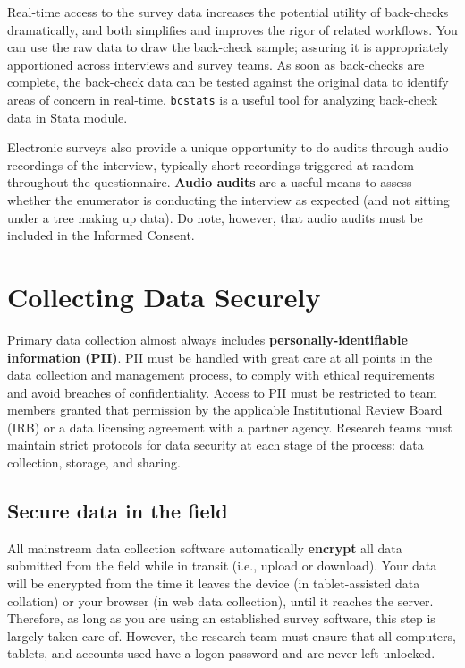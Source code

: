 Real-time access to the survey data increases the potential utility of
back-checks dramatically, and both simplifies and improves the rigor of related
workflows.
You can use the raw data to draw the back-check sample; assuring it is
appropriately apportioned across interviews and survey teams.
As soon as back-checks are complete, the back-check data can be tested against
the original data to identify areas of concern in real-time.
\texttt{bcstats} is a useful tool for analyzing back-check data in Stata module.

Electronic surveys also provide a unique opportunity to do audits through audio recordings of the interview,
typically short recordings triggered at random throughout the questionnaire.
\textbf{Audio audits} are a useful means to assess whether the enumerator is conducting the interview
as expected (and not sitting under a tree making up data).
Do note, however, that audio audits must be included in the Informed Consent.


\section{Collecting Data Securely}
Primary data collection almost always includes  \textbf{personally-identifiable information (PII)}.
PII must be handled with great care at all points in the data collection and management process, to comply with ethical requirements and avoid breaches of confidentiality. Access to PII must be restricted to team members granted that permission by the applicable Institutional Review Board (IRB) or a data licensing
agreement with a partner agency. Research teams must maintain strict protocols for data security at each stage of the process: data collection, storage, and sharing.

\subsection{Secure data in the field}
All mainstream data collection software automatically \textbf{encrypt}
all data submitted from the field while in transit (i.e., upload or download). Your
data will be encrypted from the time it leaves the device (in tablet-assisted data 
collation) or your browser (in web data collection), until it reaches the server. 
Therefore, as long as you are using an established survey software, this step is 
largely taken care of. 
However, the research team must ensure that all computers, tablets, and accounts
used have a logon password and are never left unlocked.

